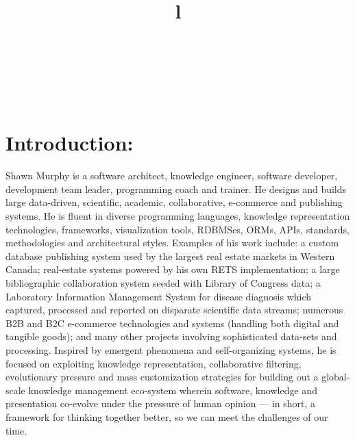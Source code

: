 \resumewidth=7in
\begin{resume}

\begin{format}
\title{l}\\
\\
\body\\
\end{format}


\section{Introduction:}
\begin{par}

Shawn Murphy is a software architect, knowledge engineer,
software developer, development team leader, programming coach
and trainer.
He designs and builds large data-driven, scientific, academic, 
collaborative, e-commerce and publishing systems. 
He is fluent in diverse programming languages, knowledge
representation technologies, frameworks, visualization tools, RDBMSes,
ORMs, APIs, standards, methodologies and architectural styles. 
Examples of his work include:
  a custom database publishing system used by the largest real estate
    markets in Western Canada;
  real-estate systems powered by his own RETS implementation; 
  a large bibliographic collaboration system seeded with Library of Congress data; 
  a Laboratory Information Management System for disease diagnosis which 
    captured, processed and reported on disparate scientific data streams; 
  numerous B2B and B2C e-commerce technologies and systems 
    (handling both digital and tangible goods);
  and many other projects involving sophisticated data-sets and processing. 
Inspired by emergent phenomena and
self-organizing systems, he is focused on exploiting knowledge
representation, collaborative filtering, evolutionary pressure and
mass customization strategies for building out a global-scale
knowledge management eco-system wherein software, knowledge and presentation
co-evolve under the pressure of human opinion --– in short, a framework for 
thinking together better, so we can meet the challenges of our time.

\end{par}






\end{resume}
